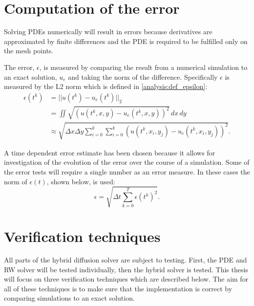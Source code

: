 \section{Computation of the error}

Solving PDEs numerically will result in errors because derivatives are approximated by finite differences and the PDE is required to be fulfilled only on the mesh points. 
% 
% 

The error, $\epsilon$, is measured by comparing the result from a numerical simulation to an exact solution, $u_e$ and taking the norm of the difference. 
Specifically $\epsilon$ is measured by the L2 norm which is defined in \eqref{analysis:def_epsilon}:
\begin{align}
 \epsilon(t^k) &= ||u(t^k)-u_e(t^k)||_2 \nonumber \\
 &= \iint\sqrt{\left(u(t^k,x,y)-u_e(t^k,x,y)\right)^2}\,dx\,dy \nonumber \\
 &\approx \sqrt{\Delta x\Delta y\sum\limits_{i=0}^k\sum\limits_{i=0}^k \left(u(t^k,x_i,y_j)-u_e(t^k,x_i,y_j)\right)^2}.\label{analysis:def_epsilon}
 \end{align}
 
\noindent A time dependent error estimate has been chosen because it allows for investigation of the evolution of the error over the course of a simulation.
Some of the error tests will require a single number as an error measure. 
In these cases the norm of $\epsilon(t)$, shown below, is used:
\begin{equation}\label{analysis:convergence_test_error}
 \epsilon = \sqrt{\Delta t\sum\limits_{k=0}^T\epsilon(t^k)^2}.
\end{equation}

\section{Verification techniques}
All parts of the hybrid diffusion solver are subject to testing. First, the PDE and RW solver will be tested individually, then the hybrid solver is tested. 
This thesis will focus on three verification techniques which are described below. 
The aim for all of these techniques is to make sure that the implementation is correct by comparing simulations to an exact solution. \\


